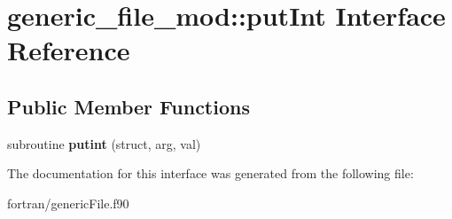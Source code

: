 \hypertarget{interfacegeneric__file__mod_1_1put_int}{}\section{generic\+\_\+file\+\_\+mod\+:\+:put\+Int Interface Reference}
\label{interfacegeneric__file__mod_1_1put_int}
\subsection*{Public Member Functions}
\begin{DoxyCompactItemize}
\item 
\mbox{\label{interfacegeneric__file__mod_1_1put_int_a0e979d67f9caee96eb970b4a1c182866}} 
subroutine {\bfseries putint} (struct, arg, val)
\end{DoxyCompactItemize}


The documentation for this interface was generated from the following file\+:\begin{DoxyCompactItemize}
\item 
fortran/generic\+File.\+f90\end{DoxyCompactItemize}
